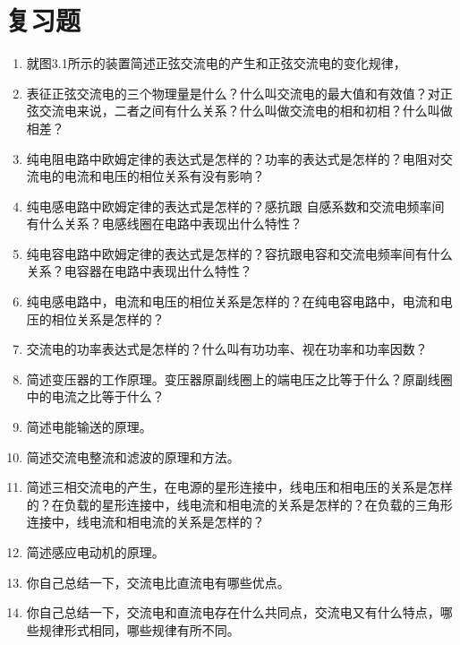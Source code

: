 \section*{复习题}
\begin{enumerate}
\item 就图3.1所示的装置简述正弦交流电的产生和正弦交流电的变化规律，
\item 表征正弦交流电的三个物理量是什么？什么叫交流电的最大值和有效值？对正弦交流电来说，二者之间有什么关系？什么叫做交流电的相和初相？什么叫做相差？
\item 纯电阻电路中欧姆定律的表达式是怎样的？功率的表达式是怎样的？电阻对交流电的电流和电压的相位关系有没有影响？
\item 纯电感电路中欧姆定律的表达式是怎样的？感抗跟
自感系数和交流电频率间有什么关系？电感线圈在电路中表现出什么特性？
\item 纯电容电路中欧姆定律的表达式是怎样的？容抗跟电容和交流电频率间有什么关系？电容器在电路中表现出什么特性？
\item 纯电感电路中，电流和电压的相位关系是怎样的？在纯电容电路中，电流和电压的相位关系是怎样的？
\item 交流电的功率表达式是怎样的？什么叫有功功率、视在功率和功率因数？
\item 简述变压器的工作原理。变压器原副线圈上的端电压之比等于什么？原副线圈中的电流之比等于什么？
\item 简述电能输送的原理。
\item 简述交流电整流和滤波的原理和方法。
\item 简述三相交流电的产生，在电源的星形连接中，线电压和相电压的关系是怎样的？在负载的星形连接中，线电流和相电流的关系是怎样的？在负载的三角形连接中，线电流和相电流的关系是怎样的？
\item 简述感应电动机的原理。
\item 你自己总结一下，交流电比直流电有哪些优点。
\item 你自己总结一下，交流电和直流电存在什么共同点，交流电又有什么特点，哪些规律形式相同，哪些规律有所不同。
\end{enumerate}

